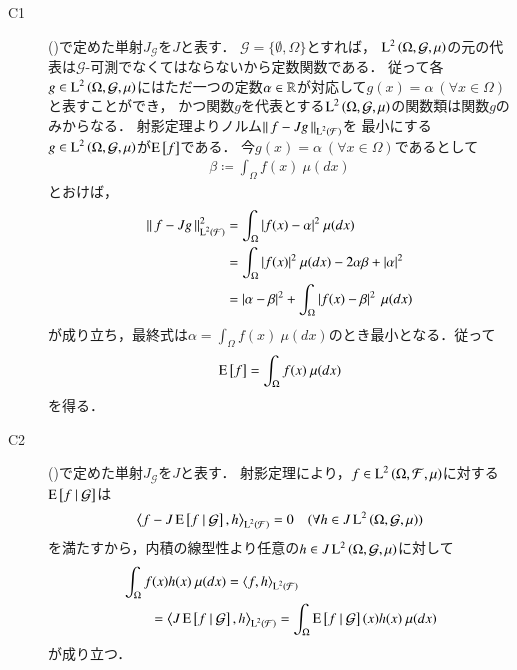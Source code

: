 				
	
	\begin{prf}\mbox{}
		\begin{description}
			\item[C1] 
				()で定めた単射$J_{\mathcal{G}}$を$J$と表す．
				$\mathcal{G} = \{\emptyset, \Omega\}$とすれば，
				$\operatorname{L}^{2} \left(\Omega, \mathcal{G},\mu\right)$の元の代表は$\mathcal{G}$-可測でなくてはならないから定数関数である．
				従って各$g \in \operatorname{L}^{2} \left(\Omega, \mathcal{G},\mu\right)$にはただ一つの定数$\alpha \in \mathbb{R}$が対応して$g(x)=\alpha\ (\forall x \in \Omega)$と表すことができ，
				かつ関数$g$を代表とする$\operatorname{L}^{2} \left(\Omega, \mathcal{G},\mu\right)$の関数類は関数$g$のみからなる．
				射影定理よりノルム$\left\|\, f-J g\, \right\|_{\operatorname{L}^{2} \left(\mathcal{F}\right)}$を
				最小にする$g \in \operatorname{L}^{2} \left(\Omega, \mathcal{G},\mu\right)$が$\operatorname{E} \left[ f \right]$である．
				今$g(x)=\alpha\ (\forall x \in \Omega)$であるとして
				\begin{align}
					\beta \coloneqq \int_{\Omega} f(x)\ \mu(dx)
				\end{align}
				とおけば，
				\begin{align}
					\left\|\, f-J g\, \right\|_{\operatorname{L}^{2} \left(\mathcal{F}\right)}^2 
					&= \int_{\Omega} |f(x) - \alpha|^2\ \mu(dx) \\
					&= \int_{\Omega} |f(x)|^2\ \mu(dx) - 2 \alpha \beta + |\alpha|^2 \\
					&= \left| \alpha - \beta \right|^2 + \int_{\Omega} \left| f(x) - \beta \right|^2\ \mu(dx)
				\end{align}
				が成り立ち，最終式は$\alpha = \int_{\Omega} f(x)\ \mu(dx)$のとき最小となる．従って
				\begin{align}
					\operatorname{E} \left[ f \right] = \int_{\Omega} f(x)\ \mu(dx)
				\end{align}
				を得る．
				
			\item[C2] 
				()で定めた単射$J_{\mathcal{G}}$を$J$と表す．
				射影定理により，$f \in \operatorname{L}^{2} \left(\Omega, \mathcal{F},\mu\right)$に対する$\operatorname{E} \left[ f \ \middle|\ \mathcal{G} \right]$は
				\begin{align}
					\inprod<f - J \cexp{f}{\mathcal{G}}, h>_{\Lp{2}{\mathcal{F}}} = 0 \quad (\forall h \in J \Lp{2}{\Omega, \mathcal{G},\mu})
				\end{align}
				を満たすから，内積の線型性より任意の$h \in J \operatorname{L}^{2} \left(\Omega, \mathcal{G},\mu\right)$に対して
				\begin{align}
					&\int_{\Omega} f(x)h(x)\ \mu(dx) = \inprod<f, h>_{\Lp{2}{\mathcal{F}}} \\
					&\qquad = \inprod<J \cexp{f}{\mathcal{G}}, h>_{\Lp{2}{\mathcal{F}}} = \int_{\Omega} \cexp{f}{\mathcal{G}}(x)h(x)\ \mu(dx)
				\end{align}
				が成り立つ．
				

\end{description}
\end{prf}
